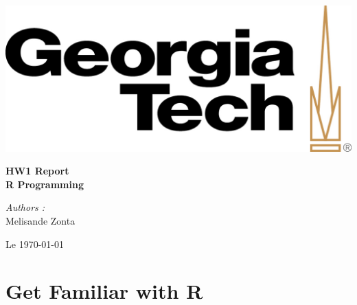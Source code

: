 \documentclass[a4paper,11pt]{article}
\begin{document}

\begin{titlepage}

\begin{center}
\includegraphics[scale=0.4]{GT_logo.jpeg}
\end{center}
\hrulefill
\begin{center}\bfseries\huge
   HW1 Report \\
    R Programming\\
    \hrulefill
\end{center}
\vspace*{1cm}
\begin{minipage}[t]{0.3\textwidth}
  \begin{flushleft} \large
    \emph{Subject : }\\
    CSE6242 Spring 2017 - OMS}\\
  \end{flushleft}
\end{minipage}
\begin{minipage}[t]{0.6\textwidth}
  \begin{flushright} \large
    \emph{Authors :} \\
    Melisande Zonta \\
  \end{flushright}
\end{minipage}
\begin{flushright}
       Le \today 
\end{flushright} 

\end{titlepage}


\section{Get Familiar with R}
\end{document}
